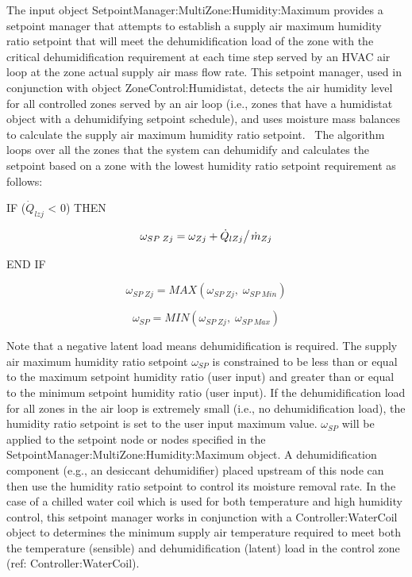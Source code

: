 The input object SetpointManager:MultiZone:Humidity:Maximum provides a setpoint manager that attempts to establish a supply air maximum humidity ratio setpoint that will meet the dehumidification load of the zone with the critical dehumidification requirement at each time step served by an HVAC air loop at the zone actual supply air mass flow rate. This setpoint manager, used in conjunction with object ZoneControl:Humidistat, detects the air humidity level for all controlled zones served by an air loop (i.e., zones that have a humidistat object with a dehumidifying setpoint schedule), and uses moisture mass balances to calculate the supply air maximum humidity ratio setpoint.~ The algorithm loops over all the zones that the system can dehumidify and calculates the setpoint based on a zone with the lowest humidity ratio setpoint requirement as follows:

IF (\({\dot Q_{lzj}}\) \textless{} 0) THEN

\begin{equation}
{\omega_{SP\;Zj}} = {\omega_{Zj}} + {{{{\dot Q}_{lZj}}} \mathord{\left/ {\vphantom {{{{\dot Q}_{lZj}}} {{{\dot m}_{Zj}}}}} \right. } {{{\dot m}_{Zj}}}}
\end{equation}

END IF

\begin{equation}
{\omega_{SP\;Zj}} = MAX\left( {{\omega_{SP\;Zj}},\;{\omega_{SP\;Min}}} \right)
\end{equation}

\begin{equation}
{\omega_{SP}} = MIN\left( {{\omega_{SP\;Zj}},\;{\omega_{SP\;Max}}} \right)
\end{equation}

Note that a negative latent load means dehumidification is required. The supply air maximum humidity ratio setpoint \({\omega_{SP}}\) is constrained to be less than or equal to the maximum setpoint humidity ratio (user input) and greater than or equal to the minimum setpoint humidity ratio (user input). If the dehumidification load for all zones in the air loop is extremely small (i.e., no dehumidification load), the humidity ratio setpoint is set to the user input maximum value. \({\omega_{SP}}\) will be applied to the setpoint node or nodes specified in the SetpointManager:MultiZone:Humidity:Maximum object. A dehumidification component (e.g., an desiccant dehumidifier) placed upstream of this node can then use the humidity ratio setpoint to control its moisture removal rate. In the case of a chilled water coil which is used for both temperature and high humidity control, this setpoint manager works in conjunction with a Controller:WaterCoil object to determines the minimum supply air temperature required to meet both the temperature (sensible) and dehumidification (latent) load in the control zone (ref: Controller:WaterCoil).

